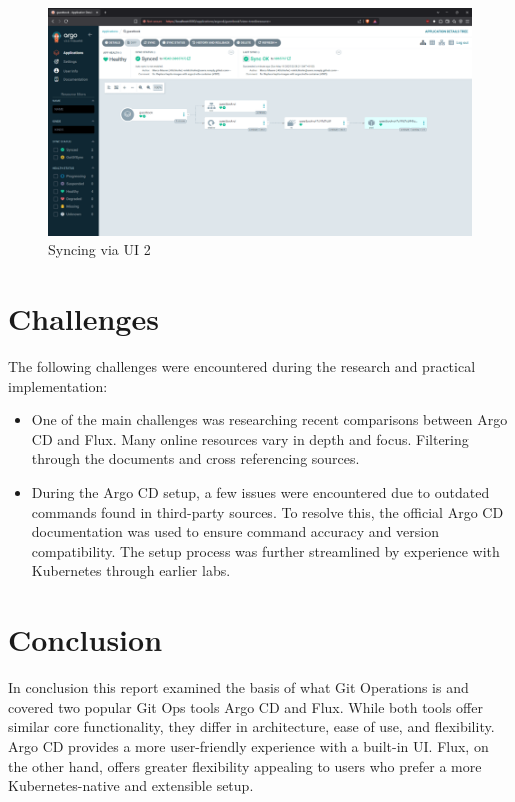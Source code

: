 \documentclass[conference]{IEEEtran}
\begin{document}
\begin{figure}[htbp]
    \centering
    \includegraphics[width=1\linewidth]{Syncing via UI 2.png}
    \caption{Syncing via UI 2}
    \label{fig:sync-via-ui-2}
\end{figure}

\section{Challenges}
The following challenges were encountered during the research and practical implementation: 

\begin{itemize}
    \item {One of the main challenges was researching recent comparisons between Argo CD and Flux. Many online resources vary in depth and focus. Filtering through the documents and cross referencing sources.}

    \item{During the Argo CD setup, a few issues were encountered due to outdated commands found in third-party sources. To resolve this, the official Argo CD documentation was used to ensure command accuracy and version compatibility. The setup process was further streamlined by experience with Kubernetes through earlier labs.}
    
\end{itemize}

\section{Conclusion}
In conclusion this report examined the basis of what Git Operations is and covered two popular Git Ops tools Argo CD and Flux. While both tools offer similar core functionality, they differ in architecture, ease of use, and flexibility. Argo CD provides a more user-friendly experience with a built-in UI. Flux, on the other hand, offers greater flexibility appealing to users who prefer a more Kubernetes-native and extensible setup.
\end{document}
